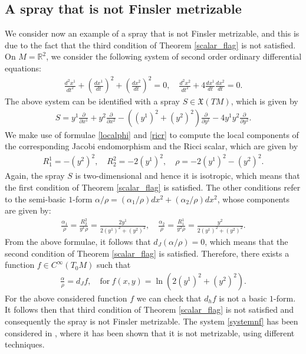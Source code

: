 \documentclass[oneside,english]{amsart}
\numberwithin{equation}{section}
\numberwithin{figure}{section}
\theoremstyle{plain}
\theoremstyle{plain}
\theoremstyle{definition}
\theoremstyle{plain}
\theoremstyle{plain}
\theoremstyle{plain}
\theoremstyle{remark}
\theoremstyle{remark}
\begin{document}
\subsection{A spray that is not Finsler metrizable}
We consider now an example of a spray that is not Finsler
metrizable, and this is due to the fact that the third condition
of Theorem \ref{scalar_flag}  is not satisfied. On $M=\mathbb{R}^2$,
we consider the following system of second
order ordinary differential equations:
\begin{eqnarray}
  \frac{d^2x^1}{dt^2} + \left(\frac{dx^1}{dt}\right)^2 + \left(\frac{dx^2}{dt}\right)^2=0, \quad
  \frac{d^2x^2}{dt^2} +4 \frac{dx^1}{dt}\frac{dx^2}{dt}=0. \label{systemnf}
\end{eqnarray}
The above system can be identified with a spray $S\in
\mathfrak{X}(TM)$, which is given by 
\begin{eqnarray*}
  S=y^1\frac{\partial}{\partial x^1} + y^2\frac{\partial}{\partial x^2}
  - \left((y^1)^2+(y^2)^2\right)\frac{\partial}{\partial y^1} -
  4y^1y^2\frac{\partial}{\partial y^2}. \label{spraynf}
\end{eqnarray*}  
We make use of formulae \eqref{localphi} and \eqref{ricr} to compute the local components of the
corresponding Jacobi endomorphism and the Ricci scalar, which are given by
\begin{eqnarray*}
  R^1_1= -(y^2)^2, \quad R^2_2= -2(y^1)^2, \quad \rho =  -2(y^1)^2 - (y^2)^2.
\end{eqnarray*}
Again, the spray $S$ is two-dimensional and hence it is isotropic,
which means that the first condition of Theorem \ref{scalar_flag}  is
satisfied. The other conditions refer to the semi-basic $1$-form $\alpha/\rho=(\alpha_1/\rho) dx^2 +
(\alpha_2/\rho) dx^2$, whose components are given by:
\begin{eqnarray*}
  \frac{\alpha_1}{\rho}=\frac{R^2_2}{y^1\rho}=\frac{2y^1}{2(y^1)^2 + (y^2)^2}, \quad
  \frac{\alpha_2}{\rho}=\frac{R^1_1}{y^2\rho}=\frac{y^2}{2(y^1)^2 + (y^2)^2}. \label{arnf}
\end{eqnarray*} 
From the above formulae, it follows that $d_J(\alpha/\rho)=0$, which
means that the second condition of Theorem \ref{scalar_flag}  is
satisfied. Therefore, there exists a function $f\in
C^{\infty}(T_0M)$ such that
\begin{eqnarray*}
  \frac{\alpha}{\rho}=d_Jf, \quad \textrm{for} \ f(x,y)=\ln(2(y^1)^2 + (y^2)^2). \end{eqnarray*}
For the above considered function $f$ we can check that $d_hf$ is not
a basic $1$-form. It follows then that third condition  of Theorem
\ref{scalar_flag} is not satisfied and consequently the spray is not
Finsler metrizable. The system \eqref{systemnf} has been considered
in \cite[Ex. 7.2]{AT92}, where it has been shown that it is not
metrizable, using different techniques. 
\end{document}
